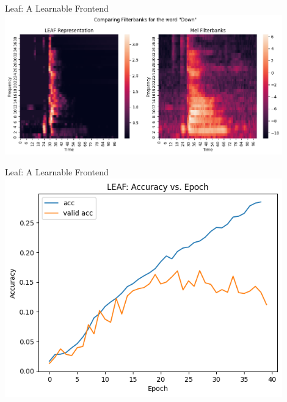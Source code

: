 \begin{frame}{Leaf: A Learnable Frontend}
    \centering
    \includegraphics[height=0.7\textheight,width=0.9\textwidth,keepaspectratio]{images/leaf_demo.png}
\end{frame}
    



\begin{frame}{Leaf: A Learnable Frontend}
    \centering
    \includegraphics[height=0.7\textheight,width=0.9\textwidth,keepaspectratio]{images/leaf_acc_epoch.png}
\end{frame}

